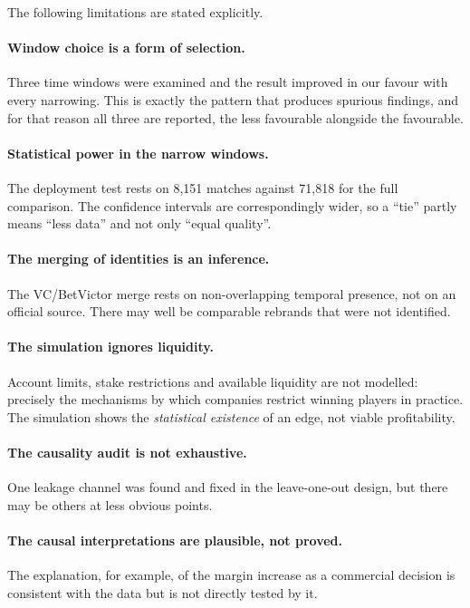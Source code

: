 \documentclass[12pt,a4paper,oneside]{report}
\renewcommand{\_}{\oldunderscore\allowbreak}
\theoremstyle{definition}
\theoremstyle{plain}
\theoremstyle{remark}
\begin{document}
The following limitations are stated explicitly.

\paragraph{Window choice is a form of selection.} Three time windows were examined and the result
improved in our favour with every narrowing. This is exactly the pattern that produces spurious
findings, and for that reason all three are reported, the less favourable alongside the
favourable.

\paragraph{Statistical power in the narrow windows.} The deployment test rests on 8,151 matches
against 71,818 for the full comparison. The confidence intervals are correspondingly wider, so a
``tie'' partly means ``less data'' and not only ``equal quality''.

\paragraph{The merging of identities is an inference.} The VC/BetVictor merge rests on
non-overlapping temporal presence, not on an official source. There may well be comparable
rebrands that were not identified.

\paragraph{The simulation ignores liquidity.} Account limits, stake restrictions and available
liquidity are not modelled: precisely the mechanisms by which companies restrict winning
players in practice. The simulation shows the \emph{statistical existence} of an edge, not
viable profitability.

\paragraph{The causality audit is not exhaustive.} One leakage channel was found and fixed in the
leave-one-out design, but there may be others at less obvious points.

\paragraph{The causal interpretations are plausible, not proved.} The explanation, for example, of
the margin increase as a commercial decision is consistent with the data but is not directly
tested by it.
\end{document}
